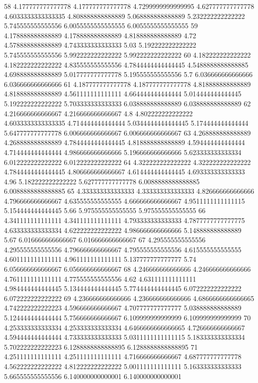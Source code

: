 58 4.177777777777778 4.177777777777778 4.7299999999999995 4.627777777777778 4.6033333333333335 4.808888888888889 5.068888888888889 5.232222222222222 5.745555555555556 6.0055555555555555 6.0055555555555555
59 4.178888888888889 4.178888888888889 4.818888888888889 4.72 4.578888888888889 4.743333333333333 5.03 5.192222222222222 5.745555555555556 5.992222222222222 5.992222222222222
60 4.182222222222222 4.182222222222222 4.835555555555556 4.7844444444444445 4.5488888888888885 4.698888888888889 5.017777777777778 5.195555555555556 5.7 6.036666666666666 6.036666666666666
61 4.187777777777778 4.187777777777778 4.818888888888889 4.818888888888889 4.561111111111111 4.664444444444444 5.014444444444445 5.192222222222222 5.703333333333333 6.038888888888889 6.038888888888889
62 4.216666666666667 4.216666666666667 4.8 4.802222222222222 4.6033333333333335 4.714444444444444 5.0344444444444445 5.174444444444444 5.647777777777778 6.006666666666667 6.006666666666667
63 4.268888888888889 4.268888888888889 4.7844444444444445 4.818888888888889 4.594444444444444 4.714444444444444 4.986666666666666 5.196666666666666 5.623333333333334 6.012222222222222 6.012222222222222
64 4.322222222222222 4.322222222222222 4.7844444444444445 4.806666666666667 4.614444444444445 4.693333333333333 4.96 5.182222222222222 5.627777777777778 6.0088888888888885 6.0088888888888885
65 4.333333333333333 4.333333333333333 4.826666666666666 4.796666666666667 4.635555555555555 4.666666666666667 4.9511111111111115 5.154444444444445 5.66 5.975555555555555 5.975555555555555
66 4.341111111111111 4.341111111111111 4.793333333333333 4.7877777777777775 4.633333333333334 4.622222222222222 4.986666666666666 5.148888888888889 5.67 6.016666666666667 6.016666666666667
67 4.295555555555556 4.295555555555556 4.796666666666667 4.795555555555556 4.615555555555555 4.601111111111111 4.961111111111111 5.137777777777777 5.74 6.056666666666667 6.056666666666667
68 4.246666666666666 4.246666666666666 4.761111111111111 4.775555555555556 4.62 4.631111111111111 4.984444444444445 5.134444444444445 5.774444444444445 6.072222222222222 6.072222222222222
69 4.236666666666666 4.236666666666666 4.6866666666666665 4.742222222222223 4.596666666666667 4.707777777777777 5.038888888888889 5.124444444444444 5.756666666666667 6.109999999999999 6.109999999999999
70 4.253333333333334 4.253333333333334 4.6466666666666665 4.726666666666667 4.594444444444444 4.733333333333333 5.0311111111111115 5.183333333333334 5.702222222222223 6.1288888888888895 6.1288888888888895
71 4.251111111111111 4.251111111111111 4.716666666666667 4.687777777777778 4.562222222222222 4.812222222222222 5.001111111111111 5.163333333333333 5.665555555555556 6.140000000000001 6.140000000000001
